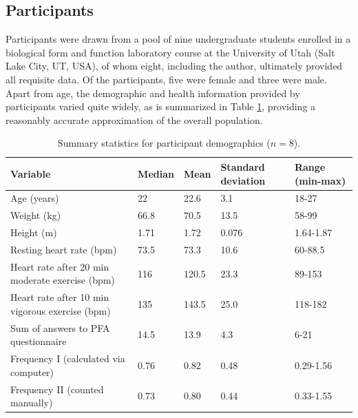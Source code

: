 \documentclass{article}
\begin{document}
\subsection{Participants}
Participants were drawn from a pool of nine undergraduate students enrolled in a biological form and function laboratory course at the University of Utah (Salt Lake City, UT, USA), of whom eight, including the author, ultimately provided all requisite data. Of the participants, five were female and three were male. Apart from age, the demographic and health information provided by participants varied quite widely, as is summarized in Table \ref{fig:summary}, providing a reasonably accurate approximation of the overall population. 
\begin{table}[h!]
\centering
\begin{tabularx}{\linewidth}{Xllll}
\toprule
Variable                                        & Median & Mean  & Standard deviation & Range (min-max) \\ \midrule
Age (years)                                     & 22     & 22.6  & 3.1                & 18-27           \\
Weight (kg)                                     & 66.8   & 70.5  & 13.5               & 58-99           \\
Height (m)                                      & 1.71   & 1.72  & 0.076              & 1.64-1.87       \\
Resting heart rate (bpm)                        & 73.5   & 73.3  & 10.6               & 60-88.5         \\
Heart rate after 20 min moderate exercise (bpm) & 116    & 120.5 & 23.3               & 89-153          \\
Heart rate after 10 min vigorous exercise (bpm) & 135    & 143.5 & 25.0               & 118-182         \\
Sum of answers to PFA questionnaire             & 14.5   & 13.9  & 4.3                & 6-21            \\
Frequency I (calculated via computer)                      & 0.76   & 0.82  & 0.48               & 0.29-1.56       \\
Frequency II (counted manually)                        & 0.73   & 0.80  & 0.44               & 0.33-1.55       \\ \bottomrule
\end{tabularx}
	\caption{Summary statistics for participant demographics ($n = 8$).}
	\label{fig:summary}
\end{table}
\end{document}
